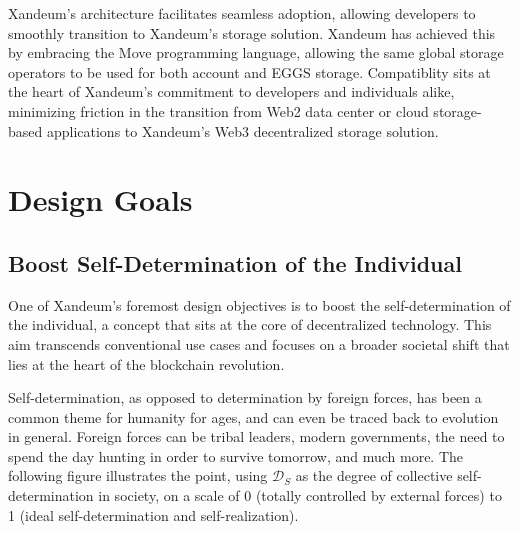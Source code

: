 \documentclass[11pt]{article}   	%
\let\oldsection\section
\renewcommand{\section}{\clearpage\oldsection}
\begin{document}
Xandeum's architecture facilitates seamless adoption, allowing developers to smoothly transition to Xandeum's storage solution. Xandeum has achieved this by embracing the Move programming language, allowing the same global storage operators to be used for both account and EGGS storage. Compatiblity sits at the heart of Xandeum's commitment to developers and individuals alike, minimizing friction in the transition from Web2 data center or cloud storage-based applications to Xandeum's Web3 decentralized storage solution.

\clearpage
\tableofcontents
\clearpage

\section{Design Goals}
\subsection{Boost Self-Determination of the Individual}
One of Xandeum's foremost design objectives is to boost the self-determination of the individual, a concept that sits at the core of decentralized technology. This aim transcends conventional use cases and focuses on a broader societal shift that lies at the heart of the blockchain revolution.

Self-determination, as opposed to determination by foreign forces, has been a common theme for humanity for ages, and can even be traced back to evolution in general. Foreign forces can be tribal leaders, modern governments, the need to spend the day hunting in order to survive tomorrow, and much more. The following figure illustrates the point, using $\mathcal{D}_{S}$ as the degree of collective self-determination in society, on a scale of 0 (totally controlled by external forces) to 1 (ideal self-determination and self-realization).

\ \\
\end{document}
